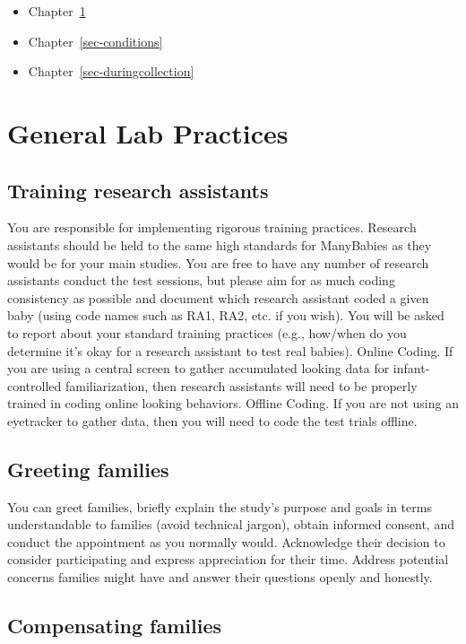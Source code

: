 \documentclass[
  letterpaper,
  DIV=11,
  numbers=noendperiod,
  oneside]{scrreprt}
\providecommand{\tightlist}{%
  \setlength{\itemsep}{0pt}\setlength{\parskip}{0pt}}
\begin{document}
\begin{itemize}
\tightlist
\item
  Chapter~\ref{sec-genlab}
\item
  Chapter~\ref{sec-conditions}
\item
  Chapter~\ref{sec-duringcollection}
\end{itemize}

\chapter{General Lab Practices}\label{sec-genlab}

\section{Training research
assistants}\label{training-research-assistants}

You are responsible for implementing rigorous training practices.
Research assistants should be held to the same high standards for
ManyBabies as they would be for your main studies. You are free to have
any number of research assistants conduct the test sessions, but please
aim for as much coding consistency as possible and document which
research assistant coded a given baby (using code names such as RA1,
RA2, etc. if you wish). You will be asked to report about your standard
training practices (e.g., how/when do you determine it's okay for a
research assistant to test real babies). Online Coding. If you are using
a central screen to gather accumulated looking data for
infant-controlled familiarization, then research assistants will need to
be properly trained in coding online looking behaviors. Offline Coding.
If you are not using an eyetracker to gather data, then you will need to
code the test trials offline.

\section{Greeting families}\label{greeting-families}

You can greet families, briefly explain the study's purpose and goals in
terms understandable to families (avoid technical jargon), obtain
informed consent, and conduct the appointment as you normally would.
Acknowledge their decision to consider participating and express
appreciation for their time. Address potential concerns families might
have and answer their questions openly and honestly.

\section{Compensating families}\label{compensating-families}
\end{document}
